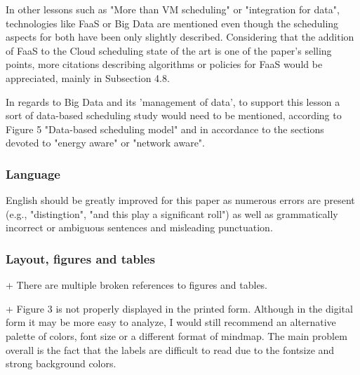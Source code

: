

In other lessons such as "More than VM scheduling" or
"integration for data", technologies like FaaS or Big Data are
mentioned even though the scheduling aspects for both have been only
slightly described. Considering that the addition of FaaS to the Cloud
scheduling state of the art is one of the paper's selling points, more
citations describing algorithms or policies for FaaS would be
appreciated, mainly in Subsection 4.8. 


In regards to Big Data and its
'management of data', to support this lesson a sort of data-based
scheduling study would need to be mentioned, according to Figure 5
"Data-based scheduling model" and in accordance to the sections
devoted to "energy aware" or "network aware".




\subsubsection{Language}

English should be greatly improved for this paper as numerous errors
are present (e.g., "distingtion", "and this play a significant roll")
as well as grammatically incorrect or ambiguous sentences and
misleading punctuation.



\subsubsection{Layout, figures and tables}

+ There are multiple broken references to figures and tables.


+ Figure 3 is not properly displayed in the printed form. Although in
the digital form it may be more easy to analyze, I would still
recommend an alternative palette of colors, font size or a different
format of mindmap. The main problem overall is the fact that the
labels are difficult to read due to the fontsize and strong background
colors.



